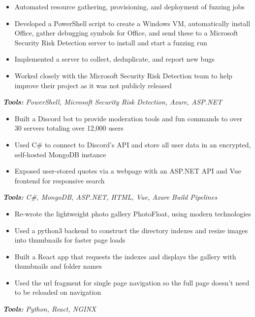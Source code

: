 \documentclass[10pt,letter]{altacv}
\begin{document}
\begin{itemize}
\item Automated resource gathering, provisioning, and deployment of fuzzing jobs
\item Developed a PowerShell script to create a Windows VM, automatically install Office, gather debugging symbols for Office, and send these to a Microsoft \\ Security Risk Detection server to install and start a fuzzing run
\item Implemented a server to collect, deduplicate, and report new bugs
\item Worked closely with the Microsoft Security Risk Detection team to help improve their project as it was not publicly released
\end{itemize}
\textit{\textbf{Tools:} PowerShell, Microsoft Security Risk Detection, Azure, ASP.NET}


\begin{itemize}
\item Built a Discord bot to provide moderation tools and fun commands to over 30 servers totaling over 12,000 users
\item Used C\# to connect to Discord's API and store all user data in an encrypted, self-hosted MongoDB instance
\item Exposed user-stored quotes via a webpage with an ASP.NET API and Vue frontend for responsive search
\end{itemize}
\textit{\textbf{Tools:} C\#, MongoDB, ASP.NET, HTML, Vue, Azure Build Pipelines}

\divider

\begin{itemize}
\item Re-wrote the lightweight photo gallery PhotoFloat, using modern technologies
\item Used a python3 backend to construct the directory indexes and resize images into thumbnails for faster page loads
\item Built a React app that requests the indexes and displays the gallery with thumbnails and folder names
\item Used the url fragment for single page navigation so the full page doesn't need to be reloaded on navigation
\end{itemize}
\textit{\textbf{Tools:} Python, React, NGINX}
\end{document}
